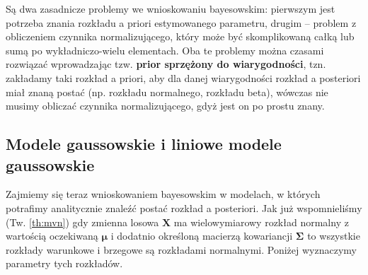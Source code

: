 \documentclass{myclass}
\numberwithin{equation}{section}
\begin{document}
Są dwa zasadnicze problemy we wnioskowaniu bayesowskim: pierwszym jest potrzeba znania rozkładu a
priori estymowanego parametru, drugim -- problem z obliczeniem czynnika normalizującego, który może
być skomplikowaną całką lub sumą po wykładniczo-wielu elementach. Oba te problemy można czasami
rozwiązać wprowadzając tzw. \textbf{prior sprzężony do wiarygodności}, tzn. zakładamy taki rozkład a
priori, aby dla danej wiarygodności rozkład a posteriori miał znaną postać (np. rozkładu normalnego,
rozkładu beta), wówczas nie musimy obliczać czynnika normalizującego, gdyż jest on po prostu znany.


\subsection{Modele gaussowskie i liniowe modele gaussowskie}

Zajmiemy się teraz wnioskowaniem bayesowskim w modelach, w których potrafimy analitycznie znaleźć
postać rozkład a posteriori. Jak już wspomnieliśmy (Tw. \ref{th:mvn}) gdy zmienna losowa
\(\mathbf{X}\) ma wielowymiarowy rozkład normalny z wartością oczekiwaną \(\boldsymbol{\mu}\) i
dodatnio określoną macierzą kowariancji \(\boldsymbol{\Sigma}\) to wszystkie rozkłady warunkowe i
brzegowe są rozkładami normalnymi. Poniżej wyznaczymy parametry tych rozkładów.
\end{document}
